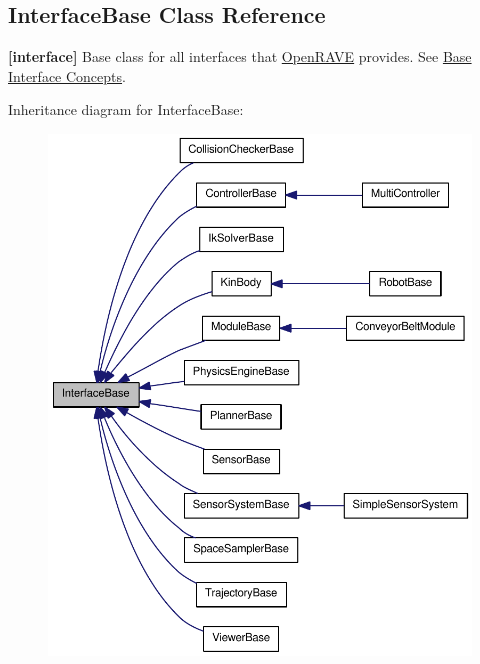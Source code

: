 \hypertarget{classOpenRAVE_1_1InterfaceBase}{
\subsection{InterfaceBase Class Reference}
\label{classOpenRAVE_1_1InterfaceBase}
}


{\bfseries \mbox{[}interface\mbox{]}} Base class for all interfaces that \hyperlink{namespaceOpenRAVE}{OpenRAVE} provides. See \hyperlink{interface__concepts}{Base Interface Concepts}.  




Inheritance diagram for InterfaceBase:\nopagebreak
\begin{figure}[H]
\begin{center}
\leavevmode
\includegraphics[width=400pt]{classOpenRAVE_1_1InterfaceBase__inherit__graph}
\end{center}
\end{figure}
